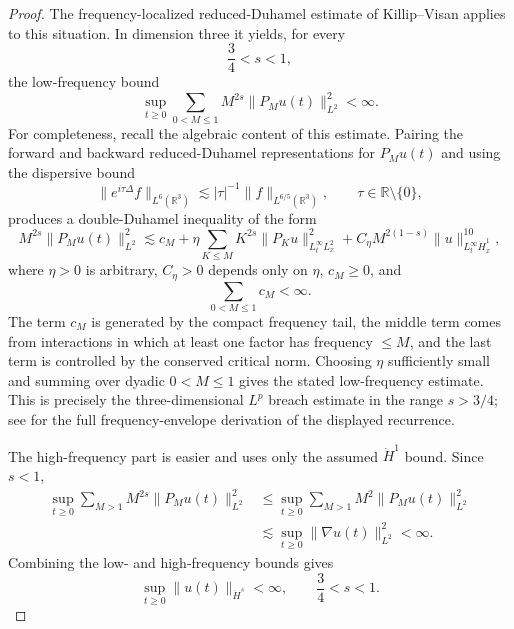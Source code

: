 \documentclass[10pt,a4paper]{amsart}
\numberwithin{equation}{section}
\newcommand{\R}{\mathbb R}
\begin{document}
\begin{proof}
The frequency-localized reduced-Duhamel estimate of Killip--Visan applies to this situation. In dimension three it yields, for every
\begin{equation*}
  \frac34<s<1,
\end{equation*}
the low-frequency bound
\begin{equation*}
  \sup_{t\ge0}\sum_{0<M\le1} M^{2s}\|P_Mu(t)\|_{L^2}^2<\infty.
\end{equation*}
For completeness, recall the algebraic content of this estimate. Pairing the forward and backward reduced-Duhamel representations for $P_Mu(t)$ and using the dispersive bound
\begin{equation*}
  \|e^{i\tau\Delta}f\|_{L^6(\R^3)}
  \lesssim |\tau|^{-1}\|f\|_{L^{6/5}(\R^3)},
  \qquad \tau\in\R\setminus\{0\},
\end{equation*}
produces a double-Duhamel inequality of the form
\begin{equation*}
  M^{2s}\|P_Mu(t)\|_{L^2}^2
  \lesssim c_M
  +\eta\sum_{K\le M}K^{2s}\|P_Ku\|_{L_t^\infty L_x^2}^2
  +C_\eta M^{2(1-s)}\|u\|_{L_t^\infty\dot H_x^1}^{10},
\end{equation*}
where $\eta>0$ is arbitrary, $C_\eta>0$ depends only on $\eta$, $c_M\ge0$, and
\begin{equation*}
  \sum_{0<M\le1}c_M<\infty.
\end{equation*}
The term $c_M$ is generated by the compact frequency tail, the middle term comes from interactions in which at least one factor has frequency $\le M$, and the last term is controlled by the conserved critical norm. Choosing $\eta$ sufficiently small and summing over dyadic $0<M\le1$ gives the stated low-frequency estimate. This is precisely the three-dimensional $L^p$ breach estimate in the range $s>3/4$; see \cite{KillipVisan2010,KillipVisan2013} for the full frequency-envelope derivation of the displayed recurrence.

The high-frequency part is easier and uses only the assumed $\dot H^1$ bound. Since $s<1$,
\begin{align*}
  \sup_{t\ge0}\sum_{M>1}M^{2s}\|P_Mu(t)\|_{L^2}^2
  &\le \sup_{t\ge0}\sum_{M>1}M^{2}\|P_Mu(t)\|_{L^2}^2  \\
  &\lesssim \sup_{t\ge0}\|\nabla u(t)\|_{L^2}^2
  <\infty.
\end{align*}
Combining the low- and high-frequency bounds gives
\begin{equation*}
  \sup_{t\ge0}\|u(t)\|_{\dot H^s}<\infty,
  \qquad \frac34<s<1.
\end{equation*}


\end{proof}
\end{document}
